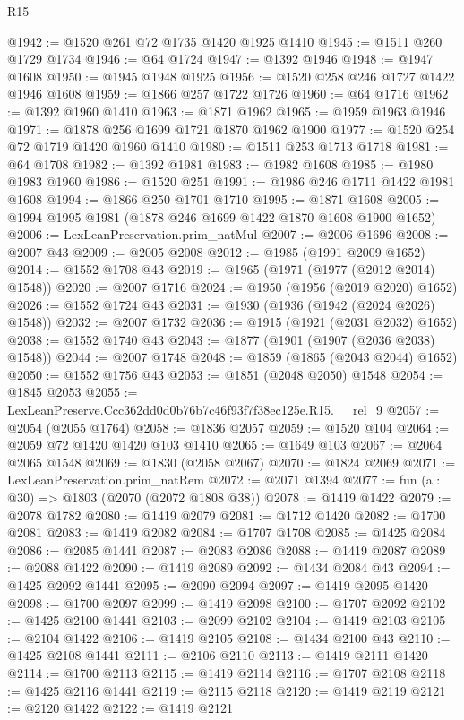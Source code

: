 \begin{lexlean}{R15}
\begin{coremodule}
@1942 := @1520 @261 @72 @1735 @1420 @1925 @1410
@1945 := @1511 @260 @1729 @1734
@1946 := @64 @1724
@1947 := @1392 @1946
@1948 := @1947 @1608
@1950 := @1945 @1948 @1925
@1956 := @1520 @258 @246 @1727 @1422 @1946 @1608
@1959 := @1866 @257 @1722 @1726
@1960 := @64 @1716
@1962 := @1392 @1960 @1410
@1963 := @1871 @1962
@1965 := @1959 @1963 @1946
@1971 := @1878 @256 @1699 @1721 @1870 @1962 @1900
@1977 := @1520 @254 @72 @1719 @1420 @1960 @1410
@1980 := @1511 @253 @1713 @1718
@1981 := @64 @1708
@1982 := @1392 @1981
@1983 := @1982 @1608
@1985 := @1980 @1983 @1960
@1986 := @1520 @251
@1991 := @1986 @246 @1711 @1422 @1981 @1608
@1994 := @1866 @250 @1701 @1710
@1995 := @1871 @1608
@2005 := @1994 @1995 @1981 (@1878 @246 @1699 @1422 @1870 @1608 @1900 @1652)
@2006 := LexLeanPreservation.prim_natMul
@2007 := @2006 @1696
@2008 := @2007 @43
@2009 := @2005 @2008
@2012 := @1985 (@1991 @2009 @1652)
@2014 := @1552 @1708 @43
@2019 := @1965 (@1971 (@1977 (@2012 @2014) @1548))
@2020 := @2007 @1716
@2024 := @1950 (@1956 (@2019 @2020) @1652)
@2026 := @1552 @1724 @43
@2031 := @1930 (@1936 (@1942 (@2024 @2026) @1548))
@2032 := @2007 @1732
@2036 := @1915 (@1921 (@2031 @2032) @1652)
@2038 := @1552 @1740 @43
@2043 := @1877 (@1901 (@1907 (@2036 @2038) @1548))
@2044 := @2007 @1748
@2048 := @1859 (@1865 (@2043 @2044) @1652)
@2050 := @1552 @1756 @43
@2053 := @1851 (@2048 @2050) @1548
@2054 := @1845 @2053
@2055 := LexLeanPreserve.Ccc362dd0d0b76b7c46f93f7f38ec125e.R15.__rel_9
@2057 := @2054 (@2055 @1764)
@2058 := @1836 @2057
@2059 := @1520 @104
@2064 := @2059 @72 @1420 @1420 @103 @1410
@2065 := @1649 @103
@2067 := @2064 @2065 @1548
@2069 := @1830 (@2058 @2067)
@2070 := @1824 @2069
@2071 := LexLeanPreservation.prim_natRem
@2072 := @2071 @1394
@2077 := fun (a : @30) => @1803 (@2070 (@2072 @1808 @38))
@2078 := @1419 @1422
@2079 := @2078 @1782
@2080 := @1419 @2079
@2081 := @1712 @1420
@2082 := @1700 @2081
@2083 := @1419 @2082
@2084 := @1707 @1708
@2085 := @1425 @2084
@2086 := @2085 @1441
@2087 := @2083 @2086
@2088 := @1419 @2087
@2089 := @2088 @1422
@2090 := @1419 @2089
@2092 := @1434 @2084 @43
@2094 := @1425 @2092 @1441
@2095 := @2090 @2094
@2097 := @1419 @2095 @1420
@2098 := @1700 @2097
@2099 := @1419 @2098
@2100 := @1707 @2092
@2102 := @1425 @2100 @1441
@2103 := @2099 @2102
@2104 := @1419 @2103
@2105 := @2104 @1422
@2106 := @1419 @2105
@2108 := @1434 @2100 @43
@2110 := @1425 @2108 @1441
@2111 := @2106 @2110
@2113 := @1419 @2111 @1420
@2114 := @1700 @2113
@2115 := @1419 @2114
@2116 := @1707 @2108
@2118 := @1425 @2116 @1441
@2119 := @2115 @2118
@2120 := @1419 @2119
@2121 := @2120 @1422
@2122 := @1419 @2121

\end{coremodule}
\end{lexlean}
